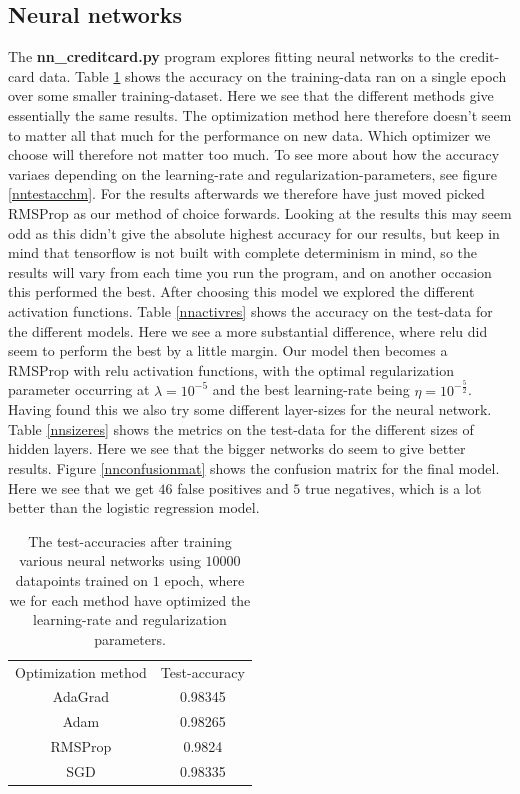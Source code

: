 \documentclass{article}
\begin{document}
\subsection{Neural networks}
The \textbf{nn\_creditcard.py} program explores fitting neural networks to the
credit-card data. Table \ref{nnmethodres} shows the accuracy on the
training-data ran on a single epoch over some smaller training-dataset. Here we
see that the different methods give essentially the same results. The
optimization method here therefore doesn't seem to matter all that much for the
performance on new data. Which optimizer we choose will therefore not matter
too much. To see more about how the accuracy variaes depending on the
learning-rate and regularization-parameters, see figure \ref{nntestacchm}. For
the results afterwards we therefore have just moved picked RMSProp as our
method of choice forwards. Looking at the results this may seem odd as this
didn't give the absolute highest accuracy for our results, but keep in mind
that tensorflow is not built with complete determinism in mind, so the results
will vary from each time you run the program, and on another occasion this
performed the best. After choosing this model we explored the different
activation functions. Table \ref{nnactivres} shows the accuracy on the
test-data for the different models. Here we see a more substantial difference,
where relu did seem to perform the best by a little margin. Our model then
becomes a RMSProp with relu activation functions, with the optimal
regularization parameter occurring at $\lambda = 10^{-5}$ and the best
learning-rate being $\eta = 10^{-\frac{5}{2}}$. Having found this we also try
some different layer-sizes for the neural network. Table \ref{nnsizeres} shows
the metrics on the test-data for the different sizes of hidden layers. Here we
see that the bigger networks do seem to give better results. Figure
\ref{nnconfusionmat} shows the confusion matrix for the final model. Here we
see that we get $46$ false positives and $5$ true negatives, which is a lot
better than the logistic regression model.

\begin{table}
	\centering
	\begin{tabular}{| c | c |}
		Optimization method & Test-accuracy \\
		AdaGrad             & 0.98345       \\
		Adam                & 0.98265       \\
		RMSProp             & 0.9824        \\
		SGD                 & 0.98335
	\end{tabular}
	\caption{The test-accuracies after training various neural networks
		using $10 000$ datapoints trained on $1$ epoch, where we for each
		method have optimized the learning-rate and regularization parameters.}
	\label{nnmethodres}
\end{table}
\end{document}
